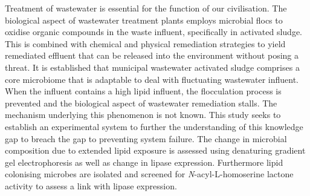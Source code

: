 Treatment of wastewater is essential for the function of our civilisation. The biological aspect of wastewater treatment plants employs microbial flocs to oxidise organic compounds in the waste influent, specifically in activated sludge. This is combined with chemical and physical remediation strategies to yield remediated effluent that can be released into the environment without posing a threat. 
It is established that municipal wastewater activated sludge comprises a core microbiome that is adaptable to deal with fluctuating wastewater influent. When the influent contains a high lipid influent, the flocculation process is prevented and the biological aspect of wastewater remediation stalls. The mechanism underlying this phenomenon is not known. This study seeks to establish an experimental system to further the understanding of this knowledge gap to breach the gap to preventing system failure.
The change in microbial composition due to extended lipid exposure is assessed using denaturing gradient gel electrophoresis as well as change in lipase expression. Furthermore lipid colonising microbes are isolated and screened for \emph{N}-acyl-L-homoserine lactone activity to assess a link with lipase expression. 